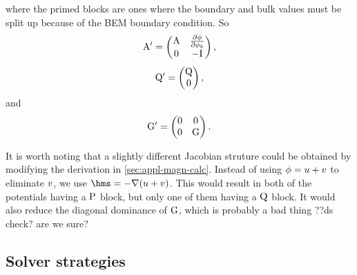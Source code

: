 
where the primed blocks are ones where the boundary and bulk values must be split up because of the BEM boundary condition.
So
\begin{equation}
  \mathrm{A}' =
  \begin{pmatrix}
    \mathrm{A}     & \frac{\partial \phi}{\partial \phi_b} \\
    0      & -\mathrm{I}  
  \end{pmatrix},
\end{equation}
\begin{equation}
  \mathrm{Q}' =
  \begin{pmatrix}
    \mathrm{Q} \\
    0    
  \end{pmatrix},
\end{equation}
and
\begin{equation}
  {\mathbf{\mathrm{G}}}' =
  \begin{pmatrix}
    0  & 0 \\
    0  & {\mathbf{\mathrm{G}}} 
  \end{pmatrix}.
\end{equation}


It is worth noting that a slightly different Jacobian struture could be obtained by modifying the derivation in \cref{sec:appl-magn-calc}.
Instead of using $\phi = u + v$ to eliminate $v$, we use $\hms = - \grad ( \phione + \phitwo)$.
This would result in both of the potentials having a $\mathrm{P}$ block, but only one of them having a $\mathrm{Q}$ block.
It would also reduce the diagonal dominance of ${\mathbf{\mathrm{G}}}$, which is probably a bad thing ??ds check? are we sure?


\subsection{Solver strategies}
\label{sec:bem-solver-strategies}

